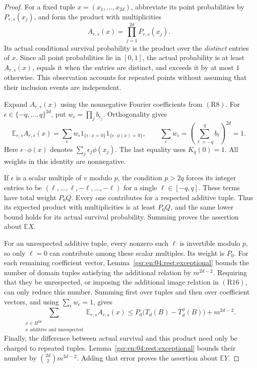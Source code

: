 \documentclass[11pt,letterpaper]{article}
\numberwithin{equation}{section}
\theoremstyle{definition}
\theoremstyle{remark}
\newcommand{\E}{\mathbb E}
\newcommand{\1}{\mathbf 1}
\begin{document}
\begin{proof}
For a fixed tuple \(x=(x_1,\ldots,x_{2d})\), abbreviate its
point probabilities by \(P_{r,s}(x_j)\), and form the
product with multiplicities
\[
 A_{r,s}(x)=\prod_{j=1}^{2d}P_{r,s}(x_j).
\]
Its actual conditional survival probability is the product
over the \emph{distinct} entries of \(x\).  Since all point
probabilities lie in \([0,1]\), the actual probability is
at least \(A_{r,s}(x)\), equals it when the entries are
distinct, and exceeds it by at most \(1\) otherwise.
This observation accounts for repeated points without
assuming that their inclusion events are independent.

Expand \(A_{r,s}(x)\) using the nonnegative Fourier
coefficients from \(\mathrm{(R8)}\).  For
\(\epsilon\in\{-q,\ldots,q\}^{2d}\), put
\(w_\epsilon=\prod_jb_{\epsilon_j}\).  Orthogonality gives
\[
 \E_{r,s}A_{r,s}(x)=
 \sum_{\epsilon}w_\epsilon
       1_{\{\epsilon\cdot x=0\}}
       1_{\{\epsilon\cdot\phi(x)=0\}},
 \qquad
 \sum_\epsilon w_\epsilon
       =\left(\sum_{\ell=-q}^qb_\ell\right)^{2d}=1.
 \tag{R16}
\]
Here \(\epsilon\cdot\phi(x)\) denotes
\(\sum_j\epsilon_j\phi(x_j)\).  The last equality uses \(K_q(0)=1\).
All weights in this identity are nonnegative.

If \(\epsilon\) is a scalar multiple of \(v\) modulo \(p\),
the condition \(p>2q\) forces its integer entries to be
\((\ell,\ldots,\ell,-\ell,\ldots,-\ell)\) for a single
\(\ell\in[-q,q]\).  These terms have total weight \(P_0Q\).
Every one contributes for a respected additive tuple.
Thus its expected product with multiplicities is at least
\(P_0Q\), and the same lower bound holds for its actual
survival probability.  Summing proves the assertion about
\(\E X\).

For an unrespected additive tuple, every nonzero such
\(\ell\) is invertible modulo \(p\), so only \(\ell=0\)
can contribute among these scalar multiples.  Its weight
is \(P_0\).  For each remaining coefficient vector,
Lemma~\ref{gsr:en:04:rest:exceptional} bounds the number of domain
tuples satisfying the additional relation by \(m^{2d-2}\).
Requiring that they be unrespected, or imposing the
additional image relation in \(\mathrm{(R16)}\), can only
reduce this number.  Summing first over tuples and then
over coefficient vectors, and using
\(\sum_\epsilon w_\epsilon=1\), gives
\[
 \sum_{\substack{x\in B^{2d}\\
                 x\text{ additive and unrespected}}}
          \E_{r,s}A_{r,s}(x)
 \leq P_0\bigl(T_d(B)-T_d^\phi(B)\bigr)+m^{2d-2}.
\]
Finally, the difference between actual survival and this
product need only be charged to repeated tuples.
Lemma~\ref{gsr:en:04:rest:exceptional} bounds their number by
\(\binom{2d}{2}m^{2d-2}\).  Adding that error proves the
assertion about \(\E Y\).
\end{proof}
\end{document}
